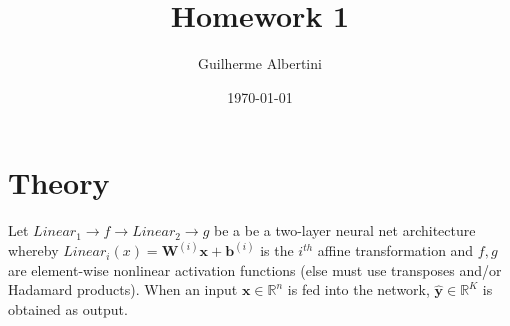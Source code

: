\documentclass{article}
\title{Homework 1}
\author{Guilherme Albertini}
\date\today
\begin{document}
\maketitle %

\section*{Theory}
Let $Linear_1 \rightarrow f \rightarrow  Linear_2 \rightarrow g $ be a be a
two-layer neural net architecture whereby $Linear_i(x) =
  \bm{W}^{(i)}\bm{x}+\bm{b}^{(i)}$ is the $i^{th}$ affine transformation and
$f,
  g$ are element-wise nonlinear activation functions (else must use transposes
and/or Hadamard products). When an input $\bm{x}\in
  \mathbb{R}^n$ is fed into the network, $\bm{\hat{y}} \in \mathbb{R}^K$ is
obtained as output.
\end{document}
